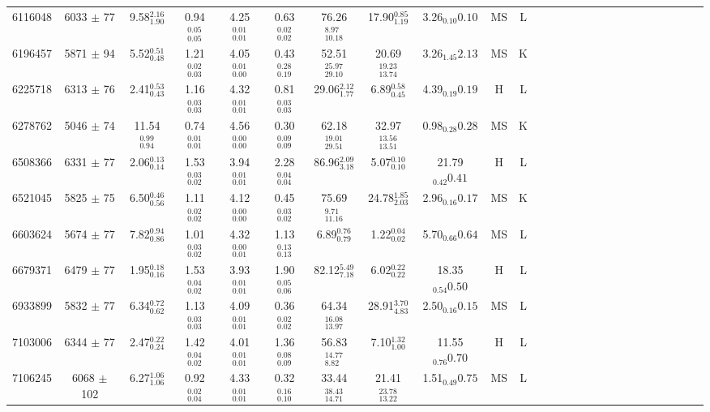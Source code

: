 \begin{table}
\begin{tabular}{cccccccccccccccccccccccccc}
6116048  & 6033 $\pm$ 77 & 9.58$_{1.90}^{2.16}$ & 0.94$_{0.05}^{0.05}$ & 4.25$_{0.01}^{0.01}$ & 0.63$_{0.02}^{0.02}$ & 76.26$_{10.18}^{8.97}$ & 17.90$_{1.19}^{0.85}$ & 3.26$_{0.10}{0.10}$ & MS & L \\
6196457  & 5871 $\pm$ 94 & 5.52$_{0.48}^{0.51}$ & 1.21$_{0.03}^{0.02}$ & 4.05$_{0.00}^{0.01}$ & 0.43$_{0.19}^{0.28}$ & 52.51$_{29.10}^{25.97}$ & 20.69$_{13.74}^{19.23}$ & 3.26$_{1.45}{2.13}$ & MS & K \\
6225718  & 6313 $\pm$ 76 & 2.41$_{0.43}^{0.53}$ & 1.16$_{0.03}^{0.03}$ & 4.32$_{0.01}^{0.01}$ & 0.81$_{0.03}^{0.03}$ & 29.06$_{1.77}^{2.12}$ & 6.89$_{0.45}^{0.58}$ & 4.39$_{0.19}{0.19}$ & H & L \\
6278762  & 5046 $\pm$ 74 & 11.54$_{0.94}^{0.99}$ & 0.74$_{0.01}^{0.01}$ & 4.56$_{0.00}^{0.00}$ & 0.30$_{0.09}^{0.09}$ & 62.18$_{29.51}^{19.01}$ & 32.97$_{13.51}^{13.56}$ & 0.98$_{0.28}{0.28}$ & MS & K \\
6508366  & 6331 $\pm$ 77 & 2.06$_{0.14}^{0.13}$ & 1.53$_{0.02}^{0.03}$ & 3.94$_{0.01}^{0.01}$ & 2.28$_{0.04}^{0.04}$ & 86.96$_{3.18}^{2.09}$ & 5.07$_{0.10}^{0.10}$ & 21.79$_{0.42}{0.41}$ & H & L \\
6521045  & 5825 $\pm$ 75 & 6.50$_{0.56}^{0.46}$ & 1.11$_{0.02}^{0.02}$ & 4.12$_{0.00}^{0.00}$ & 0.45$_{0.02}^{0.03}$ & 75.69$_{11.16}^{9.71}$ & 24.78$_{2.03}^{1.85}$ & 2.96$_{0.16}{0.17}$ & MS & K \\
6603624  & 5674 $\pm$ 77 & 7.82$_{0.86}^{0.94}$ & 1.01$_{0.02}^{0.03}$ & 4.32$_{0.01}^{0.00}$ & 1.13$_{0.13}^{0.13}$ & 6.89$_{0.79}^{0.76}$ & 1.22$_{0.02}^{0.04}$ & 5.70$_{0.66}{0.64}$ & MS & L \\
6679371  & 6479 $\pm$ 77 & 1.95$_{0.16}^{0.18}$ & 1.53$_{0.02}^{0.04}$ & 3.93$_{0.01}^{0.01}$ & 1.90$_{0.06}^{0.05}$ & 82.12$_{7.18}^{5.49}$ & 6.02$_{0.22}^{0.22}$ & 18.35$_{0.54}{0.50}$ & H & L \\
6933899  & 5832 $\pm$ 77 & 6.34$_{0.62}^{0.72}$ & 1.13$_{0.03}^{0.03}$ & 4.09$_{0.01}^{0.01}$ & 0.36$_{0.02}^{0.02}$ & 64.34$_{13.97}^{16.08}$ & 28.91$_{4.83}^{3.70}$ & 2.50$_{0.16}{0.15}$ & MS & L \\
7103006  & 6344 $\pm$ 77 & 2.47$_{0.24}^{0.22}$ & 1.42$_{0.02}^{0.04}$ & 4.01$_{0.01}^{0.01}$ & 1.36$_{0.09}^{0.08}$ & 56.83$_{8.82}^{14.77}$ & 7.10$_{1.00}^{1.32}$ & 11.55$_{0.76}{0.70}$ & H & L \\
7106245  & 6068 $\pm$ 102& 6.27$_{1.06}^{1.06}$ & 0.92$_{0.04}^{0.02}$ & 4.33$_{0.01}^{0.01}$ & 0.32$_{0.10}^{0.16}$ & 33.44$_{14.71}^{38.43}$ & 21.41$_{13.22}^{23.78}$ & 1.51$_{0.49}{0.75}$ & MS & L \\

\end{tabular}
\end{table}
